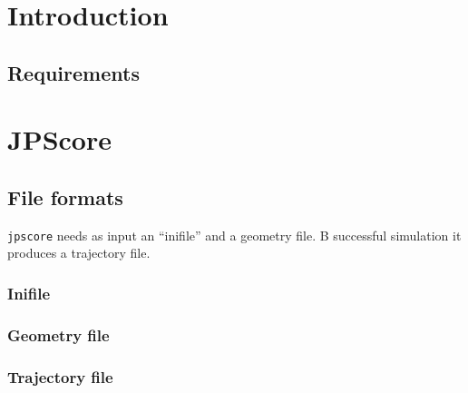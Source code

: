 \documentclass[%
paper=A4,					%
twoside=true,				%
openright,					%
parskip=full,				%
chapterprefix=true,			%
11pt,						%
headings=normal,			%
bibliography=totoc,			%
listof=totoc,				%
titlepage=on,				%
captions=tableabove,		%
draft=false,				%
]{scrreprt}%
\begin{document}
\chapter{Introduction}

% 


% 
 \newpage
\section{Requirements}

\newpage
% 
 \chapter{JPScore}
\section{File formats}
\texttt{jpscore} needs as input an ``inifile'' and a geometry file. B successful simulation it produces a trajectory file.
 
\subsection{Inifile}

\newpage
\subsection{Geometry file}

\newpage
\subsection{Trajectory file}

\end{document}
